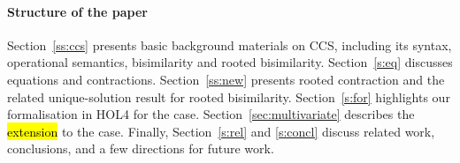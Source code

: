\paragraph{Structure of the paper}

Section~\ref{ss:ccs} presents basic background materials on CCS,
including its syntax, operational semantics, bisimilarity and rooted
bisimilarity.
Section~\ref{s:eq} discusses equations and contractions.
Section~\ref{ss:new} presents rooted contraction and the related
unique-solution result for rooted bisimilarity.
Section~\ref{s:for} highlights our formalisation in HOL4 for the \univariate case.
Section~\ref{sec:multivariate} describes the \hl{extension} to the \multivariate case.
Finally,  Section~\ref{s:rel} and \ref{s:concl} discuss related work,
conclusions, and a few directions for future work.

